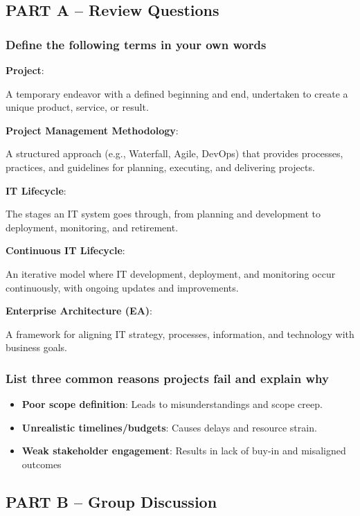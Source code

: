\subsection{PART A – Review Questions}

\subsubsection{Define the following terms in your own words}

\noindent\textbf{Project}: 


A temporary endeavor with a defined beginning and end, undertaken to create a unique product, service, or result.


\noindent\textbf{Project Management Methodology}: 

A structured approach (e.g., Waterfall, Agile, DevOps) that provides processes, practices, and guidelines for planning, executing, and delivering projects.

\noindent\textbf{IT Lifecycle}: 


The stages an IT system goes through, from planning and development to deployment, monitoring, and retirement.

\noindent\textbf{Continuous IT Lifecycle}: 


An iterative model where IT development, deployment, and monitoring occur continuously, with ongoing updates and improvements.

\noindent\textbf{Enterprise Architecture (EA)}: 


A framework for aligning IT strategy, processes, information, and technology with business goals.


\subsubsection{List three common reasons projects fail and explain why}


\begin{itemize}
    \item \textbf{Poor scope definition}: Leads to misunderstandings and scope creep.
    \item \textbf{Unrealistic timelines/budgets}: Causes delays and resource strain.
    \item \textbf{Weak stakeholder engagement}: Results in lack of buy-in and misaligned outcomes
\end{itemize}

\newpage

\subsection{PART B – Group Discussion}

